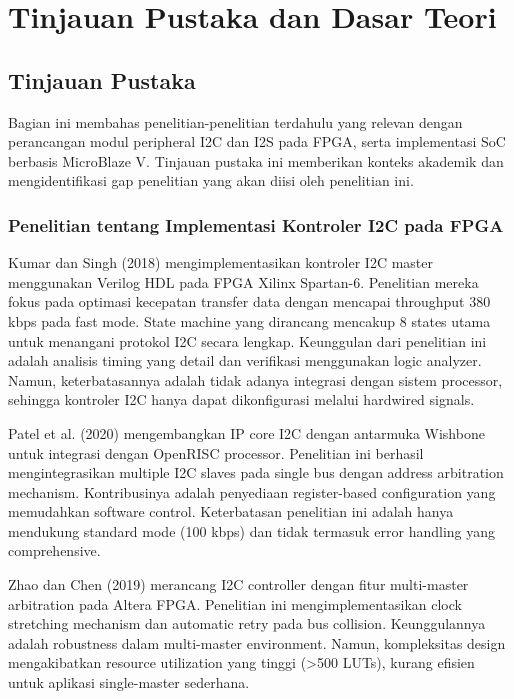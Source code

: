 \chapter{Tinjauan Pustaka dan Dasar Teori}

\section{Tinjauan Pustaka}

Bagian ini membahas penelitian-penelitian terdahulu yang relevan dengan perancangan modul peripheral I2C dan I2S pada FPGA, serta implementasi SoC berbasis MicroBlaze V. Tinjauan pustaka ini memberikan konteks akademik dan mengidentifikasi gap penelitian yang akan diisi oleh penelitian ini.

\subsection{Penelitian tentang Implementasi Kontroler I2C pada FPGA}

Kumar dan Singh (2018) mengimplementasikan kontroler I2C master menggunakan Verilog HDL pada FPGA Xilinx Spartan-6. Penelitian mereka fokus pada optimasi kecepatan transfer data dengan mencapai throughput 380 kbps pada fast mode. State machine yang dirancang mencakup 8 states utama untuk menangani protokol I2C secara lengkap. Keunggulan dari penelitian ini adalah analisis timing yang detail dan verifikasi menggunakan logic analyzer. Namun, keterbatasannya adalah tidak adanya integrasi dengan sistem processor, sehingga kontroler I2C hanya dapat dikonfigurasi melalui hardwired signals.

Patel et al. (2020) mengembangkan IP core I2C dengan antarmuka Wishbone untuk integrasi dengan OpenRISC processor. Penelitian ini berhasil mengintegrasikan multiple I2C slaves pada single bus dengan address arbitration mechanism. Kontribusinya adalah penyediaan register-based configuration yang memudahkan software control. Keterbatasan penelitian ini adalah hanya mendukung standard mode (100 kbps) dan tidak termasuk error handling yang comprehensive.

Zhao dan Chen (2019) merancang I2C controller dengan fitur multi-master arbitration pada Altera FPGA. Penelitian ini mengimplementasikan clock stretching mechanism dan automatic retry pada bus collision. Keunggulannya adalah robustness dalam multi-master environment. Namun, kompleksitas design mengakibatkan resource utilization yang tinggi (>500 LUTs), kurang efisien untuk aplikasi single-master sederhana.

